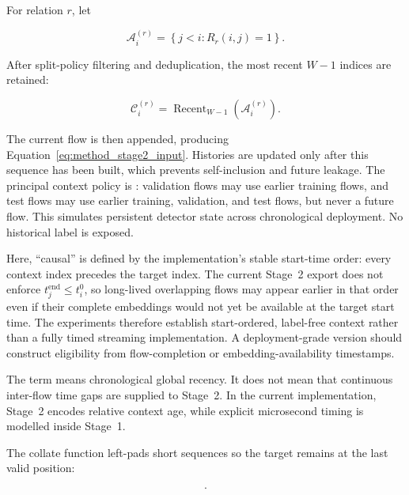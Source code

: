\documentclass[11pt,fleqn]{report}
\begin{document}
For relation $r$, let

\begin{equation}
    \mathcal{A}^{(r)}_i
    =\left\{j<i:R_r(i,j)=1\right\}.
    \label{eq:method_eligible_context}
\end{equation}

After split-policy filtering and deduplication, the most recent $W-1$ indices
are retained:

\begin{equation}
    \mathcal{C}^{(r)}_i
    =\operatorname{Recent}_{W-1}
      \left(\mathcal{A}^{(r)}_i\right).
    \label{eq:recent_context}
\end{equation}

The current flow is then appended, producing
Equation~\ref{eq:method_stage2_input}. Histories are updated only after this
sequence has been built, which prevents self-inclusion and future leakage. The
principal context policy is : validation flows may use
earlier training flows, and test flows may use earlier training, validation,
and test flows, but never a future flow. This simulates persistent detector
state across chronological deployment. No historical label is exposed.

Here, ``causal'' is defined by the implementation's stable start-time order:
every context index precedes the target index. The current Stage~2 export does
not enforce $t_j^{\mathrm{end}}\leq t_i^{0}$, so long-lived overlapping flows
may appear earlier in that order even if their complete embeddings would not
yet be available at the target start time. The experiments therefore establish
start-ordered, label-free context rather than a fully timed streaming
implementation. A deployment-grade version should construct eligibility from
flow-completion or embedding-availability timestamps.

The term  means chronological global recency. It does
not mean that continuous inter-flow time gaps are supplied to Stage~2. In the
current implementation, Stage~2 encodes relative context age, while explicit
microsecond timing is modelled inside Stage~1.

The collate function left-pads short sequences so the target remains at the last
valid position:

\begin{equation}
    [\mathrm{PAD},\ldots,\mathrm{PAD},
      \mathbf{z}^{(1)}_{j_1},\ldots,
      \mathbf{z}^{(1)}_{j_{K_i}},
      \mathbf{z}^{(1)}_i].
    \label{eq:left_padded_context}
\end{equation}
\end{document}
